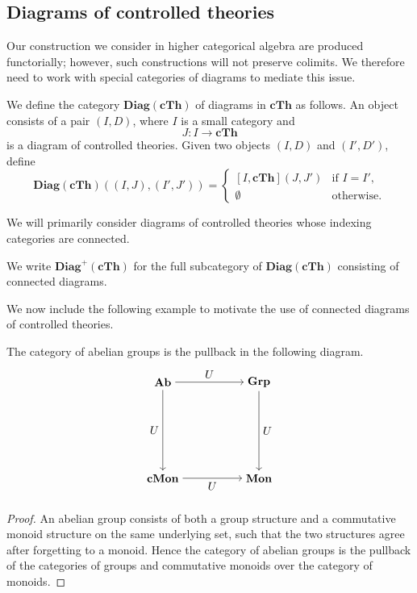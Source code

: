 \documentclass{tac}
\begin{document}
\subsection*{Diagrams of controlled theories} Our construction we consider in higher categorical algebra are produced functorially; however, such constructions will not preserve colimits. We therefore need to work with special categories of diagrams to mediate this issue.
\begin{definition}
We define the category $\mathbf{Diag}(\mathbf{cTh})$ of diagrams in
$\mathbf{cTh}$ as follows. An object consists of a pair $(I,D)$, where $I$ is
a small category and
\[
J:I\to\mathbf{cTh}
\]
is a diagram of controlled theories. Given two objects $(I,D)$ and
$(I',D')$, define
\[
\mathbf{Diag}(\mathbf{cTh})((I,J),(I',J'))
=
\begin{cases}
[I,\mathbf{cTh}](J,J') & \text{if } I=I',\\
\emptyset & \text{otherwise}.
\end{cases}
\]
\end{definition}

We will primarily consider diagrams of controlled theories whose indexing categories are connected.

\begin{notation}
We write $\mathbf{Diag}^{+}(\mathbf{cTh})$ for the full subcategory of
$\mathbf{Diag}(\mathbf{cTh})$ consisting of connected diagrams.
\end{notation}

We now include the following example to motivate the use of connected diagrams of controlled
theories.
\begin{lemma}\label{ab_is_pullback}
The category of abelian groups is the pullback in the following diagram.
\[
\begin{tikzpicture}[node distance=3cm]
\node (A) {$\mathbf{Ab}$};
\node (B)[right of=A] {$\mathbf{Grp}$};
\node (C)[below of=A] {$\mathbf{cMon}$};
\node (D)[right of=C] {$\mathbf{Mon}$};

\draw[->] (A) -- node[above] {$U$} (B);
\draw[->] (A) -- node[left] {$U$} (C);
\draw[->] (B) -- node[right] {$U$} (D);
\draw[->] (C) -- node[below] {$U$} (D);
\end{tikzpicture}
\]
\end{lemma}

\begin{proof}
An abelian group consists of both a group structure and a commutative monoid
structure on the same underlying set, such that the two structures agree after
forgetting to a monoid. Hence the category of abelian groups is the pullback of
the categories of groups and commutative monoids over the category of monoids.
\end{proof}
\end{document}
